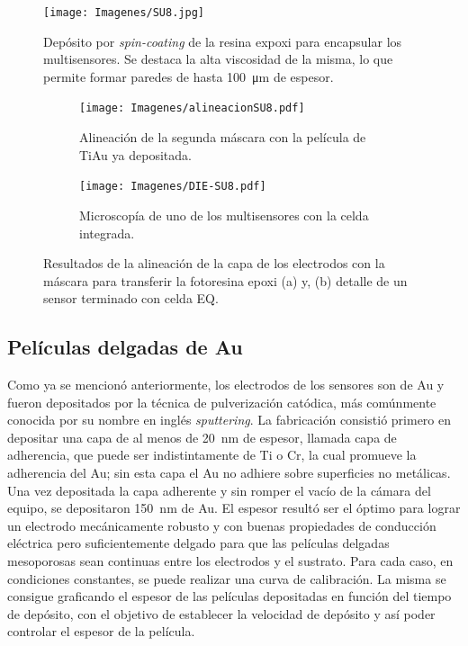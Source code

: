 			  	\begin{figure}[th!]
 				\centering
 				\texttt{[image: Imagenes/SU8.jpg]}
 				\caption[Depósito de la resina epoxi SU8]{Depósito por \textit{spin-coating }de la resina expoxi para encapsular los multisensores. Se destaca la alta viscosidad de la misma, lo que permite formar paredes de hasta \SI{100}{\um} de espesor.}
 				\label{fig:su8}
 				\vspace*{6mm}
 				\end{figure}
 		
 				\begin{figure}[th!]
			 	   	    \centering
			 	   	    \begin{subfigure}[t]{0.495\textwidth}
			        	\texttt{[image: Imagenes/alineacionSU8.pdf]}
			       		\caption{Alineación de la segunda máscara con la película de Ti\textbar Au ya depositada.}
			         	\label{fig:alineacion}
			     		\end{subfigure}
			     		\begin{subfigure}[t]{0.495\textwidth}
			     		\texttt{[image: Imagenes/DIE-SU8.pdf]}
			    		\caption{Microscopía de uno de los multisensores con la celda integrada.}
			     		\label{fig:die-su8}	
						\end{subfigure}
						\caption[Alineación y celda integrada en SU8]{Resultados de la alineación de la capa de los electrodos con la máscara para transferir la fotoresina epoxi (a) y, (b) detalle de un sensor terminado con celda EQ.}
			     		\label{fig:resultados-su8}
			     	   	\end{figure}

	\subsection{Películas delgadas de Au}

		 Como ya se mencionó anteriormente, los electrodos de los sensores son de Au y fueron depositados por la técnica de pulverización catódica, más comúnmente conocida por su nombre en inglés \textit{sputtering}. La fabricación consistió primero en depositar una capa de al menos de \SI{20}{\nm} de espesor, llamada capa de  adherencia, que puede ser indistintamente de Ti o Cr, la cual promueve la adherencia del Au; sin esta capa el Au no adhiere sobre superficies no metálicas.\cite{Hieber1976} Una vez depositada la capa adherente y sin romper el vacío de la cámara del equipo, se depositaron \SI{150}{nm} de Au. El espesor resultó ser el óptimo para lograr un electrodo mecánicamente robusto y con buenas propiedades de conducción eléctrica pero suficientemente delgado para que las películas delgadas mesoporosas sean continuas entre los electrodos y el sustrato. Para cada caso, en condiciones constantes, se puede realizar una curva de calibración. La misma se consigue graficando el espesor de las películas depositadas en función del tiempo de depósito, con el objetivo de establecer la velocidad de depósito y así poder controlar el espesor de la película. 

